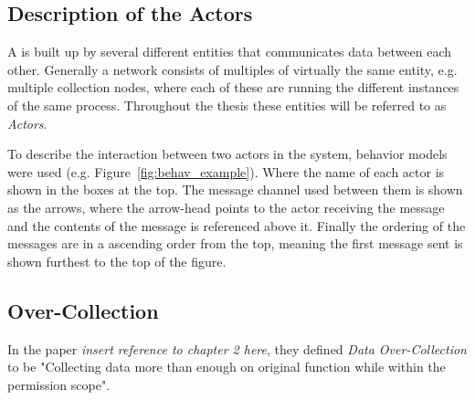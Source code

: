 

\subsection{Description of the Actors}


A \wsn is built up by several different entities that communicates data between each other. Generally a network consists of multiples of virtually the same entity, e.g. multiple collection nodes, where each of these are running the different instances of the same process. Throughout the thesis these entities will be referred to as \textit{Actors}.

To describe the interaction between two actors in the system, behavior models were used (e.g. Figure~\ref{fig:behav_example}). Where the name of each actor is shown in the boxes at the top. The message channel used between them is shown as the arrows, where the arrow-head points to the actor receiving the message and the contents of the message is referenced above it. Finally the ordering of the messages are in a ascending order from the top, meaning the first message sent is shown furthest to the top of the figure.



\subsection{Over-Collection}


In the paper \textit{insert reference to chapter 2 here}, they defined \textit{Data Over-Collection} to be "Collecting data more than enough on original function while within the permission scope". 



